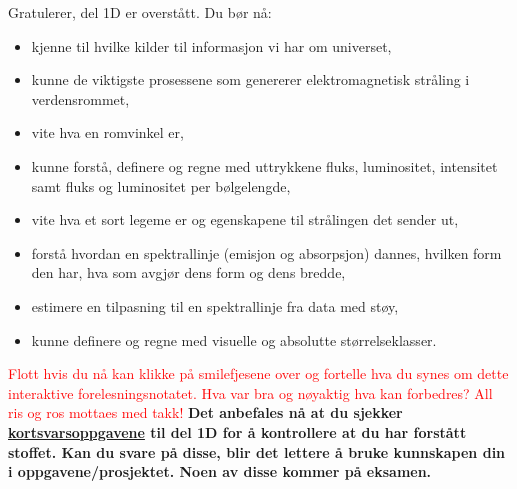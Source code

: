 \documentclass{beamer}
\let\hrefori\href
\renewcommand{\href}[2]{{\setlength{\fboxsep}{1pt}\colorbox{sunset}{\hrefori{#1}{#2}}}}
\newcommand{\pagebutton}[1]{\setbeamertemplate{button}{\tikz\node[inner xsep = 5pt, draw = structure!90, fill = green(ryb), rounded corners = 8pt]{\color{amber}\Large\insertbuttontext};}\beamerbutton{#1}}
\begin{document}
\begin{frame}
\label{oppsummering}
\hyperlink{magnitudes12}{\pagebutton{\small Forrige side}}\href{https://nettskjema.no/a/160193}{ \Changey[1][yellow]{-2}}
Gratulerer, del 1D er overstått. Du bør nå:
\begin{itemize}
\item kjenne til hvilke kilder til informasjon vi har om universet,
\item kunne de viktigste prosessene som genererer elektromagnetisk stråling i verdensrommet,
\item vite hva en romvinkel er,
\item kunne forstå, definere og regne med uttrykkene fluks, luminositet, intensitet samt fluks og luminositet per bølgelengde,
\item vite hva et sort legeme er og egenskapene til strålingen det sender ut,
\item forstå hvordan en spektrallinje (emisjon og absorpsjon) dannes, hvilken form den har, hva som avgjør dens form og dens bredde,
\item estimere en tilpasning til en spektrallinje fra data med støy,
\item kunne definere og regne med visuelle og absolutte størrelseklasser.
\end{itemize}
\textcolor{red}{Flott hvis du nå kan klikke på smilefjesene over og fortelle hva du synes om dette interaktive forelesningsnotatet. Hva var bra og nøyaktig hva kan forbedres? All ris og ros mottaes med takk!}
{\bf Det anbefales nå at du sjekker \href{https://www.uio.no/studier/emner/matnat/astro/AST2000/h21/undervisningsmateriell/kortsvarsoppgaver/del1d.pdf}{kortsvarsoppgavene} til del 1D for å kontrollere at du har forstått stoffet. Kan du svare på disse, blir det lettere å bruke kunnskapen din i oppgavene/prosjektet. Noen av disse kommer på eksamen.}\\
\end{frame}
\end{document}
